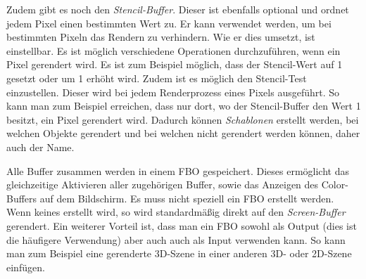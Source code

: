Zudem gibt es noch den \textit{Stencil-Buffer}. Dieser ist ebenfalls optional und ordnet jedem Pixel einen bestimmten Wert zu. Er kann verwendet werden, um bei bestimmten Pixeln das Rendern zu verhindern. Wie er dies umsetzt, ist einstellbar. Es ist möglich verschiedene Operationen durchzuführen, wenn ein Pixel gerendert wird. Es ist zum Beispiel möglich, dass der Stencil-Wert auf 1 gesetzt oder um 1 erhöht wird. 
Zudem ist es möglich den Stencil-Test einzustellen. Dieser wird bei jedem Renderprozess eines Pixels ausgeführt. So kann man zum Beispiel erreichen, dass nur dort, wo der Stencil-Buffer den Wert 1 besitzt, ein Pixel gerendert wird. 
Dadurch können \textit{Schablonen} erstellt werden, bei welchen Objekte gerendert und bei welchen nicht gerendert werden können, daher auch der Name.

Alle Buffer zusammen werden in einem \ac{FBO} gespeichert. Dieses ermöglicht das gleichzeitige Aktivieren aller zugehörigen Buffer, sowie das Anzeigen des Color-Buffers auf dem Bildschirm. Es muss nicht speziell ein \ac{FBO} erstellt werden. Wenn keines erstellt wird, so wird standardmäßig direkt auf den \textit{Screen-Buffer} gerendert. Ein weiterer Vorteil ist, dass man ein \ac{FBO} sowohl als Output (dies ist die häufigere Verwendung) aber auch auch als Input verwenden kann. So kann man zum Beispiel eine gerenderte 3D-Szene in einer anderen 3D- oder 2D-Szene einfügen.  

